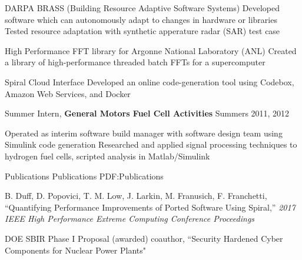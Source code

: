 \documentclass[letterpaper,MMMyyyy,nonstopmode]{simpleresumecv}
\begin{document}
\begin{Body}
\BulletItem
DARPA BRASS (Building Resource Adaptive Software Systems)
\SubBulletItem
Developed software which can autonomously adapt to changes in hardware or libraries
\SubBulletItem
Tested resource adaptation with synthetic apperature radar (SAR) test case
\Gap

\BulletItem
High Performance FFT library for Argonne National Laboratory (ANL)
\SubBulletItem
Created a library of high-performance threaded batch FFTs for a supercomputer
\Gap

\BulletItem
Spiral Cloud Interface
\SubBulletItem
Developed an online code-generation tool using Codebox, Amazon Web Services, and Docker


\BigGap
\Entry
Summer Intern,
\textbf{General Motors Fuel Cell Activities}
\hfill
Summers 2011, 2012

\Gap
\BulletItem
Operated as interim software build manager with software design team using Simulink code generation
\Gap
\BulletItem
Researched and applied signal processing techniques to hydrogen fuel cells, scripted analysis in Matlab/Simulink


%
%
%




\Section
{Publications}
{Publications}
{PDF:Publications}

\begingroup

\Gap
B. Duff, D. Popovici, T. M. Low, J. Larkin, M. Franusich, F. Franchetti,
``Quantifying Performance Improvements of Ported Software Using Spiral,''
\textit{2017 IEEE High Performance Extreme Computing Conference Proceedings}

\Gap
DOE SBIR Phase I Proposal (awarded) coauthor, ``Security Hardened Cyber Components for Nuclear Power Plants"



\end{Body}
\end{document}
